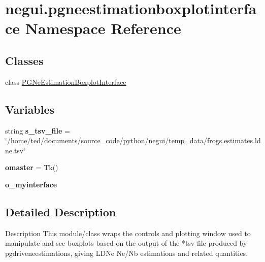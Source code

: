 \hypertarget{namespacenegui_1_1pgneestimationboxplotinterface}{}\section{negui.\+pgneestimationboxplotinterface Namespace Reference}
\label{namespacenegui_1_1pgneestimationboxplotinterface}
\subsection*{Classes}
\begin{DoxyCompactItemize}
\item 
class \hyperlink{classnegui_1_1pgneestimationboxplotinterface_1_1PGNeEstimationBoxplotInterface}{P\+G\+Ne\+Estimation\+Boxplot\+Interface}
\end{DoxyCompactItemize}
\subsection*{Variables}
\begin{DoxyCompactItemize}
\item 
string {\bfseries s\+\_\+tsv\+\_\+file} = \char`\"{}/home/ted/documents/source\+\_\+code/python/negui/temp\+\_\+data/frogs.\+estimates.\+ldne.\+tsv\char`\"{}\hypertarget{namespacenegui_1_1pgneestimationboxplotinterface_ac1005ef22f5ed551f08aa600ffe63288}{}\label{namespacenegui_1_1pgneestimationboxplotinterface_ac1005ef22f5ed551f08aa600ffe63288}

\item 
{\bfseries omaster} = Tk()\hypertarget{namespacenegui_1_1pgneestimationboxplotinterface_a1cb4b5659f78221c7eaf14acb21866d6}{}\label{namespacenegui_1_1pgneestimationboxplotinterface_a1cb4b5659f78221c7eaf14acb21866d6}

\item 
{\bfseries o\+\_\+myinterface}
\end{DoxyCompactItemize}


\subsection{Detailed Description}
\begin{DoxyVerb}Description
This module/class wraps the controls and plotting
window used to manipulate and see boxplots
based on the output of the *tsv file produced
by pgdriveneestimations, giving LDNe Ne/Nb 
estimations and related quantities.
\end{DoxyVerb}
 

